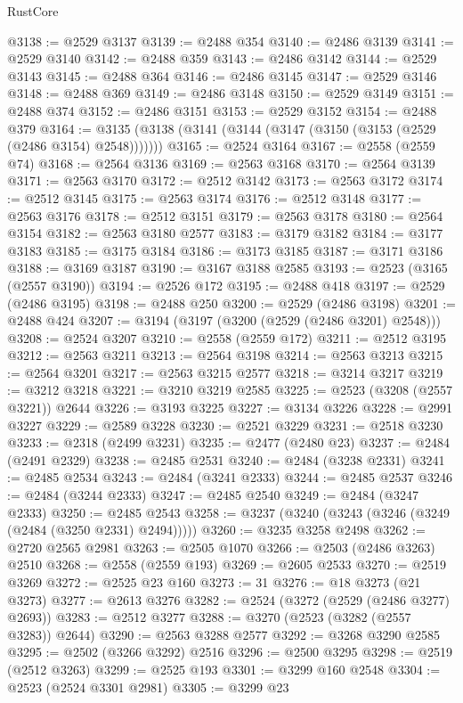 \begin{lexlean}{RustCore}
\begin{coremodule}
@3138 := @2529 @3137
@3139 := @2488 @354
@3140 := @2486 @3139
@3141 := @2529 @3140
@3142 := @2488 @359
@3143 := @2486 @3142
@3144 := @2529 @3143
@3145 := @2488 @364
@3146 := @2486 @3145
@3147 := @2529 @3146
@3148 := @2488 @369
@3149 := @2486 @3148
@3150 := @2529 @3149
@3151 := @2488 @374
@3152 := @2486 @3151
@3153 := @2529 @3152
@3154 := @2488 @379
@3164 := @3135 (@3138 (@3141 (@3144 (@3147 (@3150 (@3153 (@2529 (@2486 @3154) @2548)))))))
@3165 := @2524 @3164
@3167 := @2558 (@2559 @74)
@3168 := @2564 @3136
@3169 := @2563 @3168
@3170 := @2564 @3139
@3171 := @2563 @3170
@3172 := @2512 @3142
@3173 := @2563 @3172
@3174 := @2512 @3145
@3175 := @2563 @3174
@3176 := @2512 @3148
@3177 := @2563 @3176
@3178 := @2512 @3151
@3179 := @2563 @3178
@3180 := @2564 @3154
@3182 := @2563 @3180 @2577
@3183 := @3179 @3182
@3184 := @3177 @3183
@3185 := @3175 @3184
@3186 := @3173 @3185
@3187 := @3171 @3186
@3188 := @3169 @3187
@3190 := @3167 @3188 @2585
@3193 := @2523 (@3165 (@2557 @3190))
@3194 := @2526 @172
@3195 := @2488 @418
@3197 := @2529 (@2486 @3195)
@3198 := @2488 @250
@3200 := @2529 (@2486 @3198)
@3201 := @2488 @424
@3207 := @3194 (@3197 (@3200 (@2529 (@2486 @3201) @2548)))
@3208 := @2524 @3207
@3210 := @2558 (@2559 @172)
@3211 := @2512 @3195
@3212 := @2563 @3211
@3213 := @2564 @3198
@3214 := @2563 @3213
@3215 := @2564 @3201
@3217 := @2563 @3215 @2577
@3218 := @3214 @3217
@3219 := @3212 @3218
@3221 := @3210 @3219 @2585
@3225 := @2523 (@3208 (@2557 @3221)) @2644
@3226 := @3193 @3225
@3227 := @3134 @3226
@3228 := @2991 @3227
@3229 := @2589 @3228
@3230 := @2521 @3229
@3231 := @2518 @3230
@3233 := @2318 (@2499 @3231)
@3235 := @2477 (@2480 @23)
@3237 := @2484 (@2491 @2329)
@3238 := @2485 @2531
@3240 := @2484 (@3238 @2331)
@3241 := @2485 @2534
@3243 := @2484 (@3241 @2333)
@3244 := @2485 @2537
@3246 := @2484 (@3244 @2333)
@3247 := @2485 @2540
@3249 := @2484 (@3247 @2333)
@3250 := @2485 @2543
@3258 := @3237 (@3240 (@3243 (@3246 (@3249 (@2484 (@3250 @2331) @2494)))))
@3260 := @3235 @3258 @2498
@3262 := @2720 @2565 @2981
@3263 := @2505 @1070
@3266 := @2503 (@2486 @3263) @2510
@3268 := @2558 (@2559 @193)
@3269 := @2605 @2533
@3270 := @2519 @3269
@3272 := @2525 @23 @160
@3273 := 31
@3276 := @18 @3273 (@21 @3273)
@3277 := @2613 @3276
@3282 := @2524 (@3272 (@2529 (@2486 @3277) @2693))
@3283 := @2512 @3277
@3288 := @3270 (@2523 (@3282 (@2557 @3283)) @2644)
@3290 := @2563 @3288 @2577
@3292 := @3268 @3290 @2585
@3295 := @2502 (@3266 @3292) @2516
@3296 := @2500 @3295
@3298 := @2519 (@2512 @3263)
@3299 := @2525 @193
@3301 := @3299 @160 @2548
@3304 := @2523 (@2524 @3301 @2981)
@3305 := @3299 @23

\end{coremodule}
\end{lexlean}
